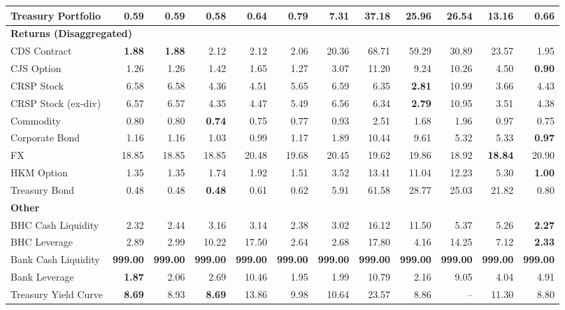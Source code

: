 \begin{table}[htbp]
\begin{tabular}{@{}lrrrrrrrrrrr@{}}
Treasury Portfolio & 0.59 & 0.59 & \textbf{0.58} & 0.64 & 0.79 & 7.31 & 37.18 & 25.96 & 26.54 & 13.16 & 0.66 \\
\midrule
\multicolumn{12}{l}{\textbf{Returns (Disaggregated)}} \\
CDS Contract & \textbf{1.88} & \textbf{1.88} & 2.12 & 2.12 & 2.06 & 20.36 & 68.71 & 59.29 & 30.89 & 23.57 & 1.95 \\
CJS Option & 1.26 & 1.26 & 1.42 & 1.65 & 1.27 & 3.07 & 11.20 & 9.24 & 10.26 & 4.50 & \textbf{0.90} \\
CRSP Stock & 6.58 & 6.58 & 4.36 & 4.51 & 5.65 & 6.59 & 6.35 & \textbf{2.81} & 10.99 & 3.66 & 4.43 \\
CRSP Stock (ex-div) & 6.57 & 6.57 & 4.35 & 4.47 & 5.49 & 6.56 & 6.34 & \textbf{2.79} & 10.95 & 3.51 & 4.38 \\
Commodity & 0.80 & 0.80 & \textbf{0.74} & 0.75 & 0.77 & 0.93 & 2.51 & 1.68 & 1.96 & 0.97 & 0.75 \\
Corporate Bond & 1.16 & 1.16 & 1.03 & 0.99 & 1.17 & 1.89 & 10.44 & 9.61 & 5.32 & 5.33 & \textbf{0.97} \\
FX & 18.85 & 18.85 & 18.85 & 20.48 & 19.68 & 20.45 & 19.62 & 19.86 & 18.92 & \textbf{18.84} & 20.90 \\
HKM Option & 1.35 & 1.35 & 1.74 & 1.92 & 1.51 & 3.52 & 13.41 & 11.04 & 12.23 & 5.30 & \textbf{1.00} \\
Treasury Bond & 0.48 & 0.48 & \textbf{0.48} & 0.61 & 0.62 & 5.91 & 61.58 & 28.77 & 25.03 & 21.82 & 0.80 \\
\midrule
\multicolumn{12}{l}{\textbf{Other}} \\
BHC Cash Liquidity & 2.32 & 2.44 & 3.16 & 3.14 & 2.38 & 3.02 & 16.12 & 11.50 & 5.37 & 5.26 & \textbf{2.27} \\
BHC Leverage & 2.89 & 2.99 & 10.22 & 17.50 & 2.64 & 2.68 & 17.80 & 4.16 & 14.25 & 7.12 & \textbf{2.33} \\
Bank Cash Liquidity & \textbf{999.00} & \textbf{999.00} & \textbf{999.00} & \textbf{999.00} & \textbf{999.00} & \textbf{999.00} & \textbf{999.00} & \textbf{999.00} & \textbf{999.00} & \textbf{999.00} & \textbf{999.00} \\
Bank Leverage & \textbf{1.87} & 2.06 & 2.69 & 10.46 & 1.95 & 1.99 & 10.79 & 2.16 & 9.05 & 4.04 & 4.91 \\
Treasury Yield Curve & \textbf{8.69} & 8.93 & \textbf{8.69} & 13.86 & 9.98 & 10.64 & 23.57 & 8.86 & -- & 11.30 & 8.80 \\
\bottomrule
\end{tabular}
\vspace{0.1cm}

\end{table}
